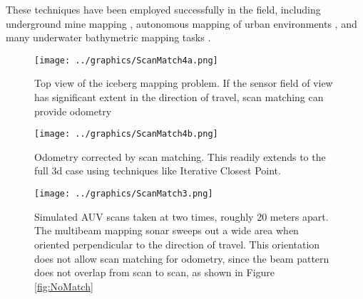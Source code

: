 These techniques have been employed successfully in the field, including underground mine mapping \cite{Bosse2003}, autonomous mapping of urban environments \cite{Thrun2006}, and many underwater bathymetric mapping tasks \cite{Caress2008}.

%
\begin{figure}[!htb]
   \centering
   \texttt{[image: ../graphics/ScanMatch4a.png]} %
   \caption{Top view of the iceberg mapping problem. If the sensor field of view has significant extent in the direction of travel, scan matching can provide odometry}
   \label{fig:ScanMatch1}
   \end{figure}
    \begin{figure}[h]
   \centering
   \texttt{[image: ../graphics/ScanMatch4b.png]} %
   \caption{Odometry corrected by scan matching. This readily extends to the full 3d case using techniques like Iterative Closest Point.}
   \label{fig:ScanMatch2}
\end{figure}

\begin{figure}[h]
   \centering
   \texttt{[image: ../graphics/ScanMatch3.png]} %
   \caption{Simulated AUV scans taken at two times, roughly 20 meters apart. The multibeam mapping sonar sweeps out a wide area when oriented perpendicular to the direction of travel. This orientation does not allow scan matching for odometry, since the beam pattern does not overlap from scan to scan, as shown in Figure \ref{fig:NoMatch}}
   \label{fig:beamOrientation}
\end{figure}

